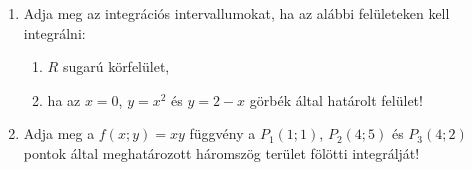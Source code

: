 \documentclass[a4paper, 12pt, fleqn]{scrartcl}
\begin{document}
\begin{enumerate}
\begin{minipage}{.3\textwidth}
\begin{center}
          \end{center}
        \end{minipage}

  \item Adja meg az integrációs intervallumokat, ha az alábbi felületeken
        kell integrálni:
        \begin{enumerate}
          \item $R$ sugarú körfelület,
          \item ha az $x = 0$, $y = x^2$ és $y = 2 - x$ görbék által határolt
                felület!
        \end{enumerate}

  \item Adja meg a $f(x; y) = xy$ függvény a $P_1(1;1)$, $P_2(4;5)$ és
        $P_3(4;2)$ pontok által meghatározott háromszög terület fölötti
        integrálját!
\end{enumerate}
\end{document}
